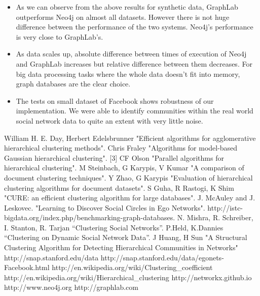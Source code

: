 \documentclass[11pt,onecolumn]{article}
\begin{document}





\begin{itemize}
\item As we can observe from the above results for synthetic data, GraphLab outperforms Neo4j on almost all datasets. However there is not huge difference between the performance of the two systems. Neo4j's performance is very close to GraphLab's.
\item As data scales up, absolute difference between times of execution of Neo4j and GraphLab increases but relative difference between them decreases. For big data processing tasks where the whole data doesn't fit into memory, graph databases are the clear choice.
\item The tests on small dataset of Facebook shows robustness of our implementation. We were able to identify communities within the real world social network data to quite an extent with very little noise.
\end{itemize}
\begin{thebibliography}{1}
\small
{} William H. E. Day, Herbert Edelsbrunner "Efficient algorithms for agglomerative hierarchical clustering methods".
Chris Fraley "Algorithms for model-based Gaussian hierarchical clustering".
[3] CF Olson "Parallel algorithms for hierarchical clustering".
M Steinbach, G Karypis, V Kumar "A comparison of document clustering techniques".
Y Zhao, G Karypis "Evaluation of hierarchical clustering algorithms for document datasets".
S Guha, R Rastogi, K Shim "CURE: an efficient clustering algorithm for large databases".
J. McAuley and J. Leskovec. "Learning to Discover Social Circles in Ego Networks".
http://istc-bigdata.org/index.php/benchmarking-graph-databases.
N. Mishra, R. Schreiber, I. Stanton, R. Tarjan “Clustering Social Networks”.
P.Held, K.Dannies “Clustering on Dynamic Social Network Data”.
 J Huang, H Sun "A Structural Clustering Algorithm for Detecting Hierarchical Communities in Networks"
 http://snap.stanford.edu/data
 http://snap.stanford.edu/data/egonets-Facebook.html
 http://en.wikipedia.org/wiki/Clustering\_coefficient
 http://en.wikipedia.org/wiki/Hierarchical\_clustering
 http://networkx.github.io
 http://www.neo4j.org
 http://graphlab.com

\end{thebibliography}
\end{document}
